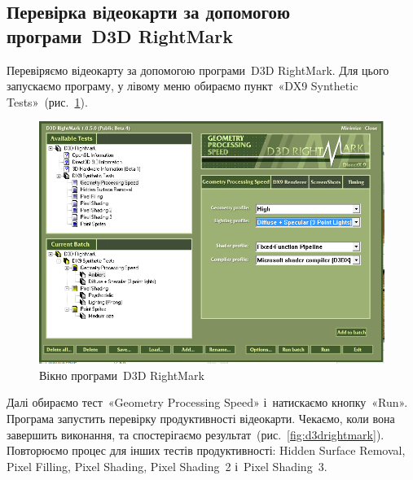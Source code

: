 \documentclass[
	a4paper,
	oneside,
	BCOR = 10mm,
	DIV = 12,
	12pt,
	headings = normal,
]{scrartcl}
\begin{document}
	
		\subsection{Перевірка відеокарти за допомогою програми~\textenglish{D3D RightMark}}
			Перевіряємо відеокарту за допомогою програми~\textenglish{D3D RightMark}. Для цього запускаємо програму, у лівому меню обираємо пункт~«\textenglish{DX9 Synthetic Tests}»~(рис.~\ref{fig:d3drightmark-prerun}).
			
			\begin{figure}[!htbp]
				\centering
				\includegraphics[height = 12\baselineskip]{./assets/y03s02-pcdiag-lab-04-p03-d3drightmark-prerun.png}
				\caption{Вікно програми~\textenglish{D3D RightMark}}
				\label{fig:d3drightmark-prerun}
			\end{figure}
			
			Далі обираємо тест~«\textenglish{Geometry Processing Speed}» і~натискаємо кнопку~«\textenglish{Run}». Програма запустить перевірку продуктивності відеокарти. Чекаємо, коли вона завершить виконання, та спостерігаємо результат~(рис.~\ref{fig:d3drightmark}). Повторюємо процес для інших тестів продуктивності: \textenglish{Hidden Surface Removal}, \textenglish{Pixel Filling}, \textenglish{Pixel Shading}, \textenglish{Pixel Shading~2} і~\textenglish{Pixel Shading~3}.
\end{document}
